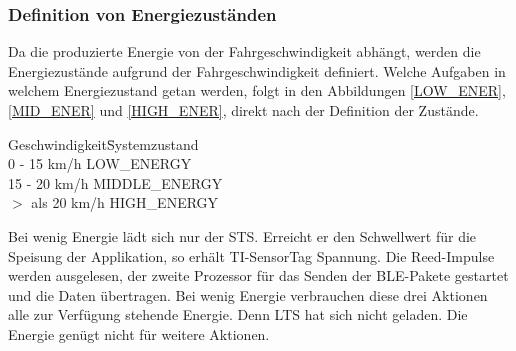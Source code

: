 
\subsubsection*{Definition von Energiezuständen}
\label{def_zustaende} 

Da die produzierte Energie von der Fahrgeschwindigkeit abhängt, werden die Energiezustände aufgrund der Fahrgeschwindigkeit definiert. Welche Aufgaben in welchem Energiezustand getan werden, folgt in den Abbildungen \ref{LOW_ENER}, \ref{MID_ENER} und \ref{HIGH_ENER}, direkt nach der Definition der Zustände. 

\begin{minipage}{\textwidth}
    \begin{tabbing}
       Geschwindigkeit\quad\= Systemzustand\\[0.8ex]
       0 - 15 km/h        \> LOW\_ENERGY\\
       15 - 20 km/h       \> MIDDLE\_ENERGY\\
       $>$ als 20 km/h    \> HIGH\_ENERGY\\    
    \end{tabbing}
\end{minipage}

Bei wenig Energie lädt sich nur der STS. Erreicht er den Schwellwert für die Speisung der Applikation, so erhält TI-SensorTag Spannung. Die Reed-Impulse werden ausgelesen, der zweite Prozessor für das Senden der BLE-Pakete gestartet und die Daten übertragen. Bei wenig Energie verbrauchen diese drei Aktionen alle zur Verfügung stehende Energie. Denn LTS hat sich nicht geladen. Die Energie genügt nicht für weitere Aktionen.

